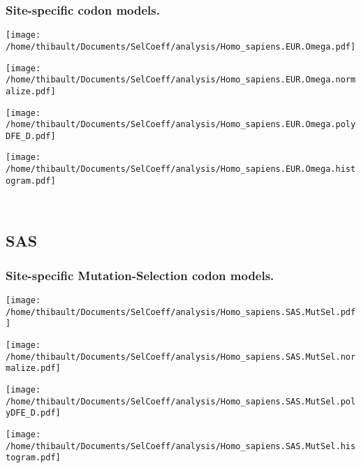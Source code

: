 \subsubsection*{Site-specific codon models.} 
\begin{minipage}{0.49\linewidth} 
\texttt{[image: /home/thibault/Documents/SelCoeff/analysis/Homo\_sapiens.EUR.Omega.pdf]} 
\end{minipage}
\begin{minipage}{0.49\linewidth} 
\texttt{[image: /home/thibault/Documents/SelCoeff/analysis/Homo\_sapiens.EUR.Omega.normalize.pdf]} 
\end{minipage}
\begin{minipage}{0.49\linewidth} 
\texttt{[image: /home/thibault/Documents/SelCoeff/analysis/Homo\_sapiens.EUR.Omega.polyDFE\_D.pdf]} 
\end{minipage}
\begin{minipage}{0.49\linewidth} 
\texttt{[image: /home/thibault/Documents/SelCoeff/analysis/Homo\_sapiens.EUR.Omega.histogram.pdf]} 
\end{minipage}
\\ 
\subsection{SAS} 
 
\subsubsection*{Site-specific Mutation-Selection codon models.} 
\begin{minipage}{0.49\linewidth} 
\texttt{[image: /home/thibault/Documents/SelCoeff/analysis/Homo\_sapiens.SAS.MutSel.pdf]} 
\end{minipage}
\begin{minipage}{0.49\linewidth} 
\texttt{[image: /home/thibault/Documents/SelCoeff/analysis/Homo\_sapiens.SAS.MutSel.normalize.pdf]} 
\end{minipage}
\begin{minipage}{0.49\linewidth} 
\texttt{[image: /home/thibault/Documents/SelCoeff/analysis/Homo\_sapiens.SAS.MutSel.polyDFE\_D.pdf]} 
\end{minipage}
\begin{minipage}{0.49\linewidth} 
\texttt{[image: /home/thibault/Documents/SelCoeff/analysis/Homo\_sapiens.SAS.MutSel.histogram.pdf]} 
\end{minipage}
\\ 
